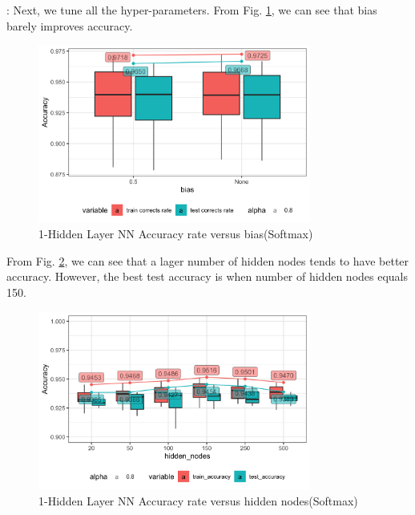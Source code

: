 \documentclass[8pt]{beamer}
\begin{document}
\begin{frame}[allowframebreaks]{\secname : \subsecname}{\subsubsecname}
Next, we tune all the hyper-parameters. From Fig. \ref{1-Hidden Layer Neural Network Accuracy rate versus bias}, we can see that bias barely improves accuracy.
\begin{figure}[htbp]
\centerline{\includegraphics[width=0.8\textwidth]{figure/1-Hidden Layer Neural Network Accuracy rate versus bias.png}}
\caption{1-Hidden Layer NN Accuracy rate versus bias(Softmax)}
\label{1-Hidden Layer Neural Network Accuracy rate versus bias}
\vspace{-1.5em}
\end{figure}

From Fig. \ref{1-Hidden Layer Neural Network Accuracy rate versus hidden nodes}, we can see that a lager number of hidden nodes tends to have better accuracy. However, the best test accuracy is when number of hidden nodes equals 150.
\begin{figure}[htbp]
\centerline{\includegraphics[width=0.8\textwidth]{figure/1-Hidden Layer Neural Network Accuracy rate versus hidden_nodes.png}}
\caption{1-Hidden Layer NN Accuracy rate versus hidden nodes(Softmax)}
\label{1-Hidden Layer Neural Network Accuracy rate versus hidden nodes}
\vspace{-1.5em}
\end{figure}


\end{frame}
\end{document}
